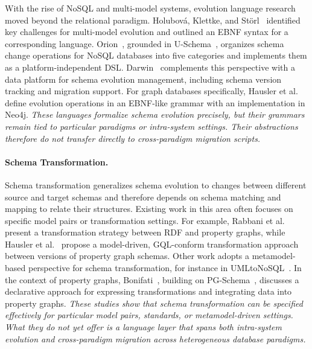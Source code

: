 \documentclass{llncs}
\begin{document}
With the rise of NoSQL and multi-model systems, evolution language research moved beyond the relational paradigm. Holubov\'a, Klettke, and St\"orl~\cite{holubova2019evolution} identified key challenges for multi-model evolution and outlined an EBNF syntax for a corresponding language. Orion~\cite{chillon2022taxonomy}, grounded in U-Schema~\cite{candel2022unified}, organizes schema change operations for NoSQL databases into five categories and implements them as a platform-independent DSL. Darwin~\cite{storl2022darwin} complements this perspective with a data platform for schema evolution management, including schema version tracking and migration support. For graph databases specifically, Hausler et al.~\cite{hausler2023language} define evolution operations in an EBNF-like grammar with an implementation in Neo4j. \textit{These languages formalize schema evolution precisely, but their grammars remain tied to particular paradigms or intra-system settings. Their abstractions therefore do not transfer directly to cross-paradigm migration scripts.}

\paragraph{Schema Transformation.}
Schema transformation generalizes schema evolution to changes between different source and target schemas and therefore depends on schema matching and mapping to relate their structures. Existing work in this area often focuses on specific model pairs or transformation settings. For example, Rabbani et al.~\cite{DBLP:journals/pacmmod/RabbaniLBH24} present a transformation strategy between RDF and property graphs, while Hausler et al.~\cite{DBLP:conf/er/HauslerEKGT25} propose a model-driven, GQL-conform transformation approach between versions of property graph schemas. Other work adopts a metamodel-based perspective for schema transformation, for instance in UMLtoNoSQL~\cite{DBLP:conf/aiccsa/AbdelhediBAZ17}. In the context of property graphs, Bonifati~\cite{DBLP:journals/pvldb/Bonifati25}, building on PG-Schema~\cite{DBLP:journals/pacmmod/AnglesBD0GHLLMM23}, discusses a declarative approach for expressing transformations and integrating data into property graphs. \textit{These studies show that schema transformation can be specified effectively for particular model pairs, standards, or metamodel-driven settings. What they do not yet offer is a language layer that spans both intra-system evolution and cross-paradigm migration across heterogeneous database paradigms.}
\end{document}
